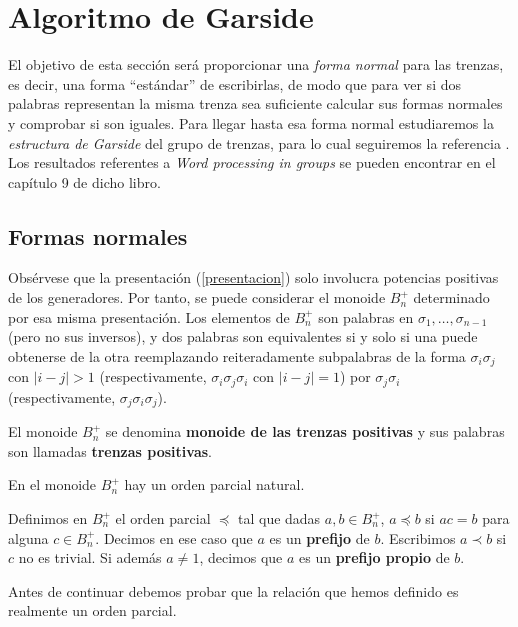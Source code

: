 \documentclass[bibtex, anon]{TEMat-article}
\begin{document}
\section{Algoritmo de Garside}
El objetivo de esta sección será proporcionar una \emph{forma normal} para las trenzas, es decir, una forma ``estándar'' de escribirlas, de modo que para ver si dos palabras representan la misma trenza sea suficiente calcular sus formas normales y comprobar si son iguales. Para llegar hasta esa forma normal estudiaremos la \emph{estructura de Garside} del grupo de trenzas, para lo cual seguiremos la referencia \cite{Garside}. Los resultados referentes a \emph{Word processing in groups} \cite{Thurston} se pueden encontrar en el capítulo 9 de dicho libro.





\subsection{Formas normales}

Obsérvese que la presentación (\ref{presentacion}) solo involucra potencias positivas de los generadores. Por tanto, se puede considerar el monoide $B_n^+$ determinado por esa misma presentación. Los elementos de $B_n^+$ son palabras en $\sigma_1,\dots,\sigma_{n-1}$ (pero no sus inversos), y dos palabras son equivalentes si y solo si una puede obtenerse de la otra reemplazando reiteradamente subpalabras de la forma $\sigma_i\sigma_j$ con $|i-j|>1$ (respectivamente, $\sigma_i\sigma_j\sigma_i$ con $|i-j|=1$) por $\sigma_j\sigma_i$ (respectivamente, $\sigma_j\sigma_i\sigma_j$).

\begin{definicion}
	El monoide $B_n^+$ se denomina \textbf{monoide de las trenzas positivas} y sus palabras son llamadas \textbf{trenzas positivas}.
\end{definicion}
En el monoide $B_n^+$ hay un orden parcial natural. 
\begin{definicion}
	Definimos en $B_n^+$ el orden parcial $\preccurlyeq$ tal que dadas $a,b\in B_n^+$, $a\preccurlyeq b$ si $ac=b$ para alguna $c\in B_n^+$. Decimos en ese caso que $a$ es un \textbf{prefijo} de $b$. Escribimos $a\prec b$ si $c$ no es trivial. Si además $a\neq 1$, decimos que $a$ es un \textbf{prefijo propio} de $b$. 
\end{definicion}

Antes de continuar debemos probar que la relación que hemos definido es realmente un orden parcial.
\end{document}
